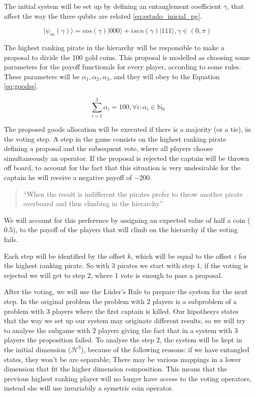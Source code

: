 The initial system will be set up by defining an entanglement coefficient $\gamma$, that affect the way the three qubits are related \ref{eq:estado_inicial_pg}.
 
\begin{equation}
\label{eq:estado_inicial_pg}
\vert \psi_{in}(\gamma) \rangle= cos( \gamma)\vert 000\rangle+ isen(\gamma)\vert 111 \rangle, \gamma \in (0,\pi)
\end{equation}

The highest ranking pirate in the hierarchy will be responsible to make a proposal to divide the 100 gold coins. This proposal is modelled as choosing some parameters for the payoff functionals for every player, according to some rules. These parameters will be $\alpha_{1}, \alpha_{2}, \alpha_{3}$, and they will obey to the Equation \ref{eq:goodss}.

\begin{equation}
\label{eq:goodss}
\sum_{i=1}^{3}\alpha_{i}=100, \forall i :\alpha_{i}\in\mathbb{N}_{0}
\end{equation}

The proposed goods allocation will be executed if there is a majority (or a tie), in the voting step. A step in the game consists on the highest ranking pirate defining a proposal and the subsequent vote, where all players choose simultaneously an operator. If the proposal is rejected the captain will be thrown off board, to account for the fact that this situation is very undesirable for the captain he will receive a negative payoff of $-200$.

\begin{quotation}
``When the result is indifferent the pirates prefer to throw another pirate overboard and thus climbing in the hierarchy.''
\end{quotation}

We will account for this preference by assigning an expected value of half a coin ($0.5$), to the payoff of the players that will climb on the hierarchy if the voting fails.

Each step will be identified by the offset $k$, which will be equal to the offset $i$ for the highest ranking pirate. So with $3$ pirates we start with step $1$, if the voting is rejected we will get to step $2$, where 1 vote is enough to pass a proposal.

After the voting, we will use the L\"{u}der's Rule to prepare the system for the next step. In the original problem the problem with $2$ players is a subproblem of a problem with $3$ players where the first captain is killed. Our hipothesys states that the way we set up our system may originate different results, so we will try to analyse the subgame with $2$ players giving the fact that in a system with $3$ players the proposition failed. To analyse the step $2$,  the system will be kept in the initial dimension ($\mathcal{H}^{3}$), because of the following reasons: if we have entangled states, they won't be are separable; There may be various mappings in a lower dimension that fit the higher dimension composition. This means that the previous highest ranking player will no longer have access to the voting operators, instead she will use invariabily a symetric coin operator.


